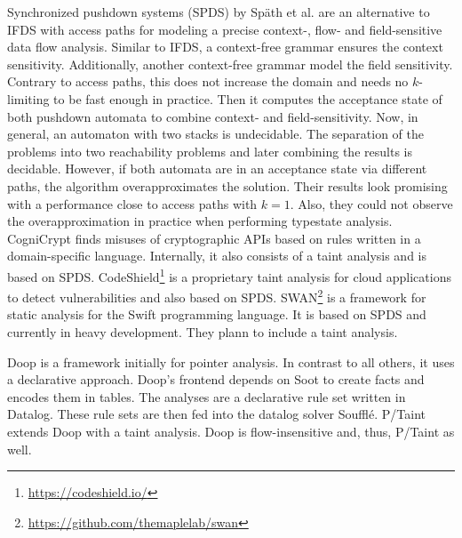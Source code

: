\documentclass[../draft.tex]{subfiles}
\begin{document}
    Synchronized pushdown systems (SPDS) by Späth et al.\cite{Spaeth2019} are an alternative to IFDS with access paths for modeling a precise context-, flow- and field-sensitive data flow analysis.
    Similar to IFDS, a context-free grammar ensures the context sensitivity.
    Additionally, another context-free grammar model the field sensitivity.
    Contrary to access paths, this does not increase the domain and needs no $k$-limiting to be fast enough in practice.
    Then it computes the acceptance state of both pushdown automata to combine context- and field-sensitivity.
    Now, in general, an automaton with two stacks is undecidable.
    The separation of the problems into two reachability problems and later combining the results is decidable.
    However, if both automata are in an acceptance state via different paths, the algorithm overapproximates the solution.
    Their results look promising with a performance close to access paths with $k=1$.
    Also, they could not observe the overapproximation in practice when performing typestate analysis.\\
    CogniCrypt\cite{Krueger2017} finds misuses of cryptographic APIs based on rules written in a domain-specific language.
    Internally, it also consists of a taint analysis and is based on SPDS.
    CodeShield\footnote{\url{https://codeshield.io/}} is a proprietary taint analysis for cloud applications to detect vulnerabilities and also based on SPDS.
    SWAN\footnote{\url{https://github.com/themaplelab/swan}} is a framework for static analysis for the Swift programming language. It is based on SPDS and currently in heavy development.
    They plann to include a taint analysis.

    Doop\cite{Bravenboer2009} is a framework initially for pointer analysis.
    In contrast to all others, it uses a declarative approach.
    Doop's frontend depends on Soot to create facts and encodes them in tables.
    The analyses are a declarative rule set written in Datalog.
    These rule sets are then fed into the datalog solver Soufflé\cite{Scholz2016}.
    P/Taint\cite{Grech2017} extends Doop with a taint analysis.
    Doop is flow-insensitive and, thus, P/Taint as well.
\end{document}
